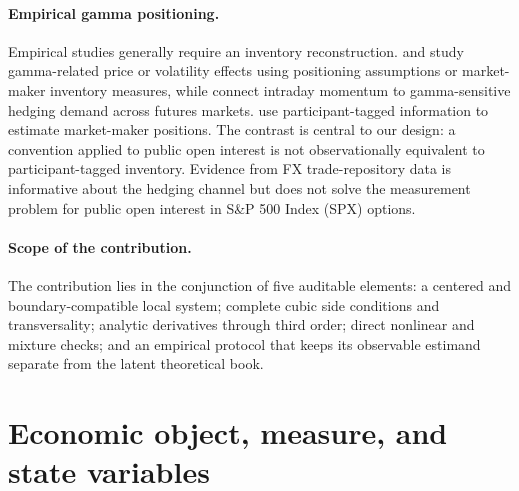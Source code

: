 \documentclass[11pt]{article}
\begin{document}
\paragraph{Empirical gamma positioning.}
Empirical studies generally require an inventory reconstruction.  \citet{barbonburaschi2021}
and \citet{dimerakervilkov2024} study gamma-related price or volatility effects using
positioning assumptions or market-maker inventory measures, while
\citet{baltussen2021hedging} connect intraday momentum to gamma-sensitive hedging demand
across futures markets.  \citet{vasquez2025zerodte}
use participant-tagged information to estimate market-maker positions.  The contrast is
central to our design: a convention applied to public open interest is not observationally
equivalent to participant-tagged inventory.  Evidence from FX trade-repository data
\citep{anderegg2022impact} is informative about the hedging channel but does not solve the
measurement problem for public open interest in S\&P 500 Index (SPX) options.

\paragraph{Scope of the contribution.}
The contribution lies in the conjunction of five auditable elements: a centered and
boundary-compatible local system; complete cubic side conditions and transversality;
analytic derivatives through third order; direct nonlinear and mixture checks; and an
empirical protocol that keeps its observable estimand separate from the latent theoretical
book.

\section{Economic object, measure, and state variables}
\label{sec:model}
\end{document}
